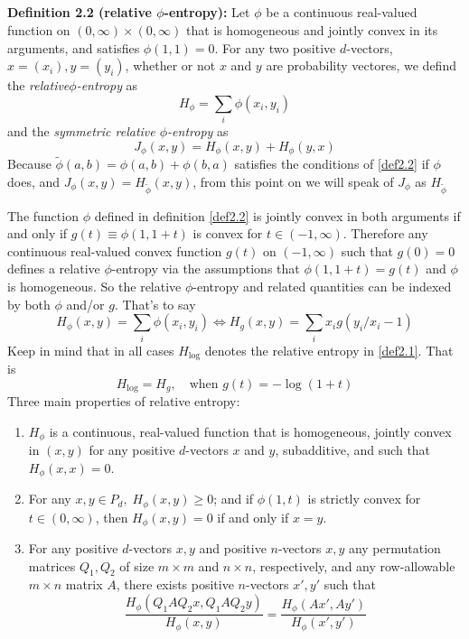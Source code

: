 \subsection*{}
\noindent\textbf{Definition 2.2 (relative $\phi$-entropy):}\label{def2.2} Let $\phi$ be a continuous real-valued function on $(0, \infty) \times (0, \infty)$ that is homogeneous and jointly convex in its arguments, and satisfies $\phi (1,1) = 0$. For any two positive $d$-vectors, $x = (x_i), y=(y_i)$, whether or not $x$ and $y$ are probability vectores, we defind the \textit{relative}$\phi$\textit{-entropy} as
\[H_\phi = \sum_i\phi(x_i,y_i)\] and the \textit{symmetric relative $\phi$-entropy} as 
\[J_\phi(x,y) = H_\phi(x,y) + H_\phi(y,x)\]
Because $\tilde{\phi}(a,b) = \phi(a,b) + \phi(b,a)$ satisfies the conditions of \ref{def2.2} if $\phi$ does, and $J_\phi(x,y) = H_{\tilde{\phi}}(x,y)$, from this point on we will speak of $J_\phi$ as $H_{\tilde{\phi}}$ 
\par The function $\phi$ defined in definition \ref{def2.2} is jointly convex in both arguments if and only if $g(t)\equiv \phi(1,1+t)$ is convex for $t \in (-1, \infty)$. Therefore any continuous real-valued convex function $g(t)$ on $(-1, \infty)$ such that $g(0)=0$ defines a relative $\phi$-entropy via the assumptions that $\phi(1,1+t) = g(t)$ and $\phi$ is homogeneous. So the relative $\phi$-entropy and related quantities can be indexed by both $\phi$ and/or $g$. That's to say \[H_\phi(x,y)=\sum_i\phi(x_i,y_i) \iff H_g(x,y) = \sum_i x_ig(y_i/x_i - 1)\]  
Keep in mind that in all cases $H_{\log}$ denotes the relative entropy in \ref{def2.1}. That is \[H_{\log} = H_g, \quad \text{when } g(t) = -\log(1+t)\] 
Three main properties of relative entropy:
\begin{enumerate}
    \item $H_\phi$ is a continuous, real-valued function that is homogeneous, jointly convex in $(x,y)$ for any positive $d$-vectors $x$ and $y$, subadditive, and such that $H_\phi(x,x) = 0$.
    \item For any $x,y \in P_d, \; H_\phi(x,y) \geq 0$; and if $\phi(1,t)$ is strictly convex for $t \in (0, \infty)$, then $H_\phi(x,y) = 0$ if and only if $x = y$.
    \item For any positive $d$-vectors $x,y$ and positive $n$-vectors $x,y$ any permutation matrices $Q_1, Q_2$ of size $m \times m$ and $n \times n$, respectively, and any row-allowable $m\times n$ matrix $A$, there exists positive $n$-vectors $x', y'$ such that \[\frac{H_\phi(Q_1 A Q_2 x, Q_1 A Q_2 y)}{H_\phi(x,y)} = \frac{H_\phi(Ax', Ay')}{H_\phi(x',y')}\]
\end{enumerate}
